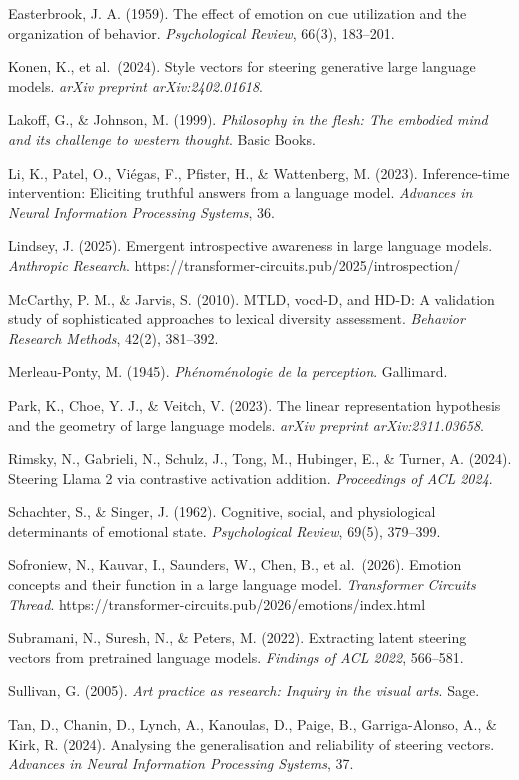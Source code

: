 \documentclass[11pt,a4paper]{article}
\begin{document}
Easterbrook, J. A. (1959). The effect of emotion on cue utilization and the organization of behavior. \emph{Psychological Review}, 66(3), 183--201.

Konen, K., et al.~(2024). Style vectors for steering generative large language models. \emph{arXiv preprint arXiv:2402.01618}.

Lakoff, G., \& Johnson, M. (1999). \emph{Philosophy in the flesh: The embodied mind and its challenge to western thought}. Basic Books.

Li, K., Patel, O., Viégas, F., Pfister, H., \& Wattenberg, M. (2023). Inference-time intervention: Eliciting truthful answers from a language model. \emph{Advances in Neural Information Processing Systems}, 36.

Lindsey, J. (2025). Emergent introspective awareness in large language models. \emph{Anthropic Research}. https://transformer-circuits.pub/2025/introspection/

McCarthy, P. M., \& Jarvis, S. (2010). MTLD, vocd-D, and HD-D: A validation study of sophisticated approaches to lexical diversity assessment. \emph{Behavior Research Methods}, 42(2), 381--392.

Merleau-Ponty, M. (1945). \emph{Phénoménologie de la perception}. Gallimard.

Park, K., Choe, Y. J., \& Veitch, V. (2023). The linear representation hypothesis and the geometry of large language models. \emph{arXiv preprint arXiv:2311.03658}.

Rimsky, N., Gabrieli, N., Schulz, J., Tong, M., Hubinger, E., \& Turner, A. (2024). Steering Llama 2 via contrastive activation addition. \emph{Proceedings of ACL 2024}.

Schachter, S., \& Singer, J. (1962). Cognitive, social, and physiological determinants of emotional state. \emph{Psychological Review}, 69(5), 379--399.

Sofroniew, N., Kauvar, I., Saunders, W., Chen, B., et al.~(2026). Emotion concepts and their function in a large language model. \emph{Transformer Circuits Thread}. https://transformer-circuits.pub/2026/emotions/index.html

Subramani, N., Suresh, N., \& Peters, M. (2022). Extracting latent steering vectors from pretrained language models. \emph{Findings of ACL 2022}, 566--581.

Sullivan, G. (2005). \emph{Art practice as research: Inquiry in the visual arts}. Sage.

Tan, D., Chanin, D., Lynch, A., Kanoulas, D., Paige, B., Garriga-Alonso, A., \& Kirk, R. (2024). Analysing the generalisation and reliability of steering vectors. \emph{Advances in Neural Information Processing Systems}, 37.
\end{document}
